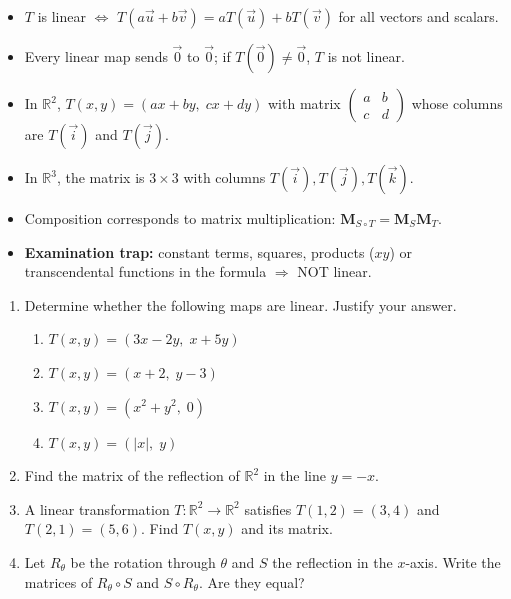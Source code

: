 \documentclass[11pt]{article}
\begin{document}
\begin{aretenir}
\begin{itemize}
    \item $T$ is linear $\iff$ $T(a\vec{u}+b\vec{v}) = aT(\vec{u})+bT(\vec{v})$ for all vectors and scalars.
    \item Every linear map sends $\vec{0}$ to $\vec{0}$; if $T(\vec{0})\neq\vec{0}$, $T$ is not linear.
    \item In $\mathbb{R}^2$, $T(x,y) = (ax+by,\; cx+dy)$ with matrix $\begin{pmatrix}a&b\\c&d\end{pmatrix}$ whose columns are $T(\vec{i})$ and $T(\vec{j})$.
    \item In $\mathbb{R}^3$, the matrix is $3\times3$ with columns $T(\vec{i}), T(\vec{j}), T(\vec{k})$.
    \item Composition corresponds to matrix multiplication: $\mathbf{M}_{S\circ T} = \mathbf{M}_S\mathbf{M}_T$.
    \item \textbf{Examination trap:} constant terms, squares, products ($xy$) or transcendental functions in the formula $\Rightarrow$ NOT linear.
\end{itemize}
\end{aretenir}

\begin{exercice}
\begin{enumerate}
    \item Determine whether the following maps are linear. Justify your answer.
        \begin{enumerate}
            \item $T(x,y) = (3x-2y,\; x+5y)$
            \item $T(x,y) = (x+2,\; y-3)$
            \item $T(x,y) = (x^2+y^2,\; 0)$
            \item $T(x,y) = (|x|,\; y)$
        \end{enumerate}
    \item Find the matrix of the reflection of $\mathbb{R}^2$ in the line $y = -x$.
    \item A linear transformation $T : \mathbb{R}^2 \to \mathbb{R}^2$ satisfies $T(1,2) = (3,4)$ and $T(2,1) = (5,6)$. Find $T(x,y)$ and its matrix.
    \item Let $R_\theta$ be the rotation through $\theta$ and $S$ the reflection in the $x$-axis. Write the matrices of $R_\theta \circ S$ and $S \circ R_\theta$. Are they equal?
\end{enumerate}
\end{exercice}
\end{document}
